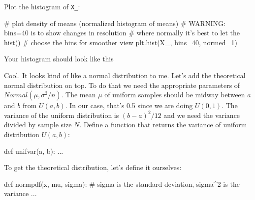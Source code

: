 \begin{fullwidth}
\step Plot the histogram of {\tt X\_}:

\begin{pyverbatim}
# plot density of means (normalized histogram of means)
# WARNING: bins=40 is to show changes in resolution
#          where normally it's best to let the hist()
#          choose the bins for smoother view
plt.hist(X_, bins=40, normed=1)
\end{pyverbatim}

\step Your histogram should look like this \\

    
Cool.  It looks kind of like a normal distribution to me. Let's add the theoretical normal distribution on top. To do that we need the appropriate parameters of $Normal(\mu, \sigma^2/n)$. The mean  $\mu$ of uniform samples should be midway between $a$ and $b$ from $U(a,b)$. In our case, that's 0.5 since we are doing $U(0,1)$. The variance of the uniform distribution is $(b-a)^2/12$ and we need the variance divided by sample size $N$.  Define a function that returns the variance of uniform distribution $U(a,b)$:

\begin{pyverbatim}
def unifvar(a, b):
    ...
\end{pyverbatim}

\step  To get the theoretical distribution, let's define it ourselves:

\begin{pyverbatim}
def normpdf(x, mu, sigma): # sigma is the standard deviation, sigma^2 is the variance
    ...
\end{pyverbatim}


\end{fullwidth}
